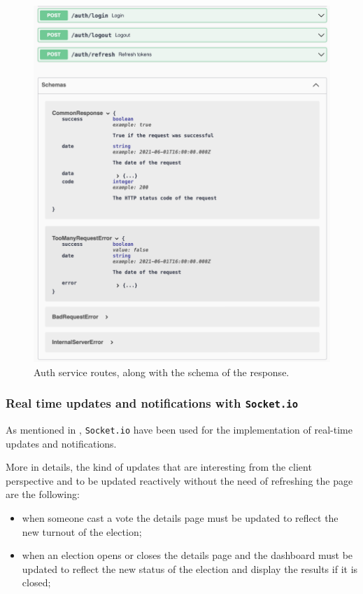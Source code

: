 \documentclass{scrartcl}
\begin{document}
\begin{figure}
    \centering
    \includegraphics[width=\textwidth]{./figures/backend-routes/auth.png}
    \caption{Auth service routes, along with the schema of the response.}
    \label{fig:backend-routes-auth}
\end{figure}

\subsubsection{Real time updates and notifications with \texttt{Socket.io}}

As mentioned in , \texttt{Socket.io} have been used for the implementation of real-time updates and notifications.

More in details, the kind of updates that are interesting from the client perspective and to be updated reactively without the need of refreshing the page are the following:

\begin{itemize}
    \item when someone cast a vote the details page must be updated to reflect the new turnout of the election;
    \item when an election opens or closes the details page and the dashboard must be updated to reflect the new status of the election and display the results if it is closed;
\end{itemize}
\end{document}
